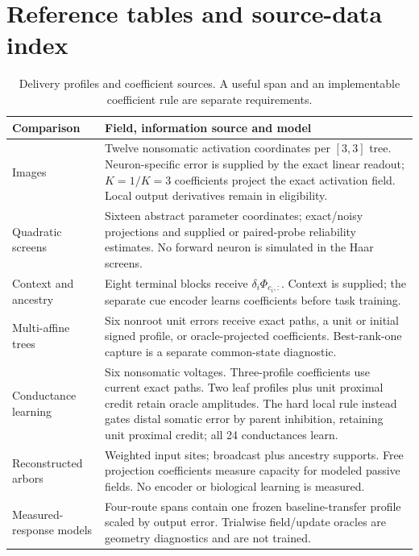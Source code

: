\section*{Reference tables and source-data index}

\begin{table}[tbp]
\centering
\caption{Delivery profiles and coefficient sources. A useful span and an implementable coefficient rule are separate requirements.}
\label{tab:feedback_objects}
\small
\begin{tabularx}{\textwidth}{p{}X}
\toprule
Comparison & Field, information source and model \\
\midrule
Images & Twelve nonsomatic activation coordinates per $[3,3]$ tree. Neuron-specific error is supplied by the exact linear readout; $K=1/K=3$ coefficients project the exact activation field. Local output derivatives remain in eligibility. \\
Quadratic screens & Sixteen abstract parameter coordinates; exact/noisy projections and supplied or paired-probe reliability estimates. No forward neuron is simulated in the Haar screens. \\
Context and ancestry & Eight terminal blocks receive $\delta_i\Phi_{c_i,:}$. Context is supplied; the separate cue encoder learns coefficients before task training. \\
Multi-affine trees & Six nonroot unit errors receive exact paths, a unit or initial signed profile, or oracle-projected coefficients. Best-rank-one capture is a separate common-state diagnostic. \\
Conductance learning & Six nonsomatic voltages. Three-profile coefficients use current exact paths. Two leaf profiles plus unit proximal credit retain oracle amplitudes. The hard local rule instead gates distal somatic error by parent inhibition, retaining unit proximal credit; all 24 conductances learn. \\
Reconstructed arbors & Weighted input sites; broadcast plus ancestry supports. Free projection coefficients measure capacity for modeled passive fields. No encoder or biological learning is measured. \\
Measured-response models & Four-route spans contain one frozen baseline-transfer profile scaled by output error. Trialwise field/update oracles are geometry diagnostics and are not trained. \\
\bottomrule
\end{tabularx}
\end{table}

